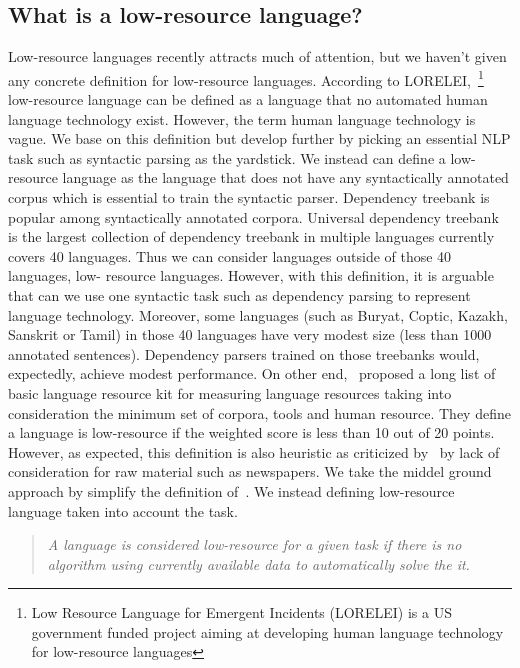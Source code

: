 \documentclass[12pt,twoside,final,hidelinks]{ltthesis}
\theoremstyle{definition}
\begin{document}
\subsection{What is a low-resource language? }
Low-resource languages recently attracts much of attention, but we haven't given 
any concrete definition for low-resource languages. According to LORELEI,~\footnote{Low Resource Language for Emergent Incidents (LORELEI) is a US government funded project aiming at developing 
human language technology for low-resource languages} low-resource 
language can be defined as a language that no automated human language technology exist. 
However, the term human language technology is vague. We base on this definition 
but develop further by picking an essential NLP task such as syntactic parsing as the yardstick. 
We instead can define a low-resource language as the 
language that does not have any syntactically annotated corpus which is essential 
to train the syntactic parser. Dependency treebank is popular among syntactically annotated corpora. 
Universal dependency treebank~\cite{11234/1-1699} 
is the largest collection of dependency treebank in multiple languages currently 
covers 40 languages. Thus we can consider languages outside of those 40 languages, low-
resource languages. However, with this definition, it is arguable that can we use one syntactic task such as 
dependency parsing to represent language technology. Moreover, some languages (such as Buryat, Coptic, Kazakh, Sanskrit or Tamil) in those 40 languages have very modest size (less than 1000 annotated sentences). Dependency parsers trained on those treebanks would, expectedly, achieve 
modest performance. On other end,~ proposed a long list of basic language resource kit for measuring language resources taking into consideration the minimum set of corpora, tools and human resource. They define a language is low-resource if the weighted score is less than 10 out of 20 points. However, as expected, this definition is also heuristic as criticized by~ by lack of consideration for raw material such as newspapers. 
We take the middel ground approach by simplify the definition of~. 
We instead defining low-resource language taken into account the task. 
\begin{quote}
\textit{A language is considered low-resource for a given task if there is no algorithm using currently available data to automatically solve the 
it.}
\end{quote}
\end{document}
